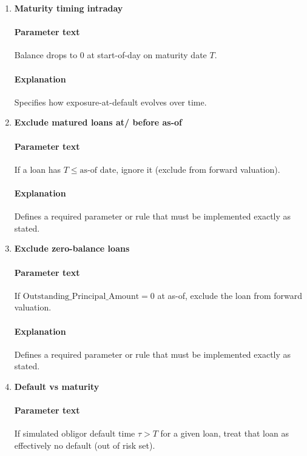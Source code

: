 \documentclass[11pt]{article}
\begin{document}
\begin{enumerate}[label=\arabic*),leftmargin=*,align=left]
\paragraph{Explanation} Specifies how exposure-at-default evolves over time.

\item \textbf{Maturity timing intraday}
\paragraph{Parameter text} Balance drops to 0 at start-of-day on maturity date $T$.
\paragraph{Explanation} Specifies how exposure-at-default evolves over time.

\item \textbf{Exclude matured loans at/ before as-of}
\paragraph{Parameter text} If a loan has $T \le \text{as-of date}$, ignore it (exclude from forward valuation).
\paragraph{Explanation} Defines a required parameter or rule that must be implemented exactly as stated.

\item \textbf{Exclude zero-balance loans}
\paragraph{Parameter text} If $\text{Outstanding\_Principal\_Amount} = 0$ at as-of, exclude the loan from forward valuation.
\paragraph{Explanation} Defines a required parameter or rule that must be implemented exactly as stated.

\item \textbf{Default vs maturity}
\paragraph{Parameter text} If simulated obligor default time $\tau > T$ for a given loan, treat that loan as effectively no default (out of risk set).

\end{enumerate}
\end{document}

